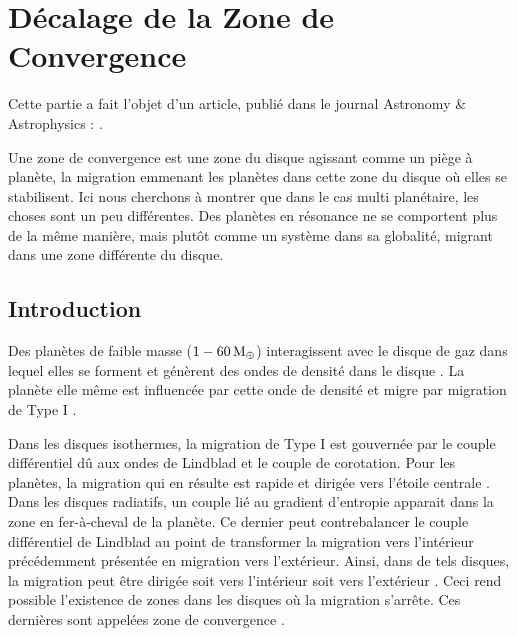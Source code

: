 
\section{Décalage de la Zone de Convergence}\label{sec:shifted_CZ}
Cette partie a fait l'objet d'un article, publié dans le journal Astronomy \& Astrophysics : \cite{cossou2013convergence}.

Une zone de convergence est une zone du disque agissant comme un piège à planète, la migration emmenant les planètes dans cette zone du disque où elles se stabilisent. Ici nous cherchons à montrer que dans le cas multi planétaire, les choses sont un peu différentes. Des planètes en résonance ne se comportent plus de la même manière, mais plutôt comme un système dans sa globalité, migrant dans une zone différente du disque.

\subsection{Introduction}
Des planètes de faible masse ($1-60\mathrm{\thinspace M_\oplus}$) interagissent avec le disque de gaz dans lequel elles se forment et génèrent des ondes de densité dans le disque \citep{goldreich1979excitation}. La planète elle même est influencée par cette onde de densité et migre par migration de Type I \citep{ward1997protoplanet}.

Dans les disques isothermes, la migration de Type I est gouvernée par le couple différentiel dû aux ondes de Lindblad et le couple de corotation. Pour les planètes, la migration qui en résulte est rapide et dirigée vers l'étoile centrale \citep{tanaka2002three}. Dans les disques radiatifs, un couple lié au gradient d'entropie apparait dans la zone en fer-à-cheval de la planète. Ce dernier peut contrebalancer le couple différentiel de Lindblad au point de transformer la migration vers l'intérieur précédemment présentée en migration vers l'extérieur. Ainsi, dans de tels disques, la migration peut être dirigée soit vers l'intérieur soit vers l'extérieur \citep{paardekooper2006halting, kley2008migration}. Ceci rend possible l'existence de zones dans les disques où la migration s'arrête. Ces dernières sont appelées zone de convergence \citep[CZs;][]{lyra2010orbital, mordasini2011application, paardekooper2011torque}.

